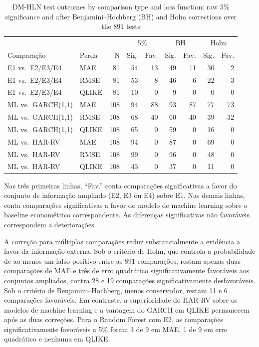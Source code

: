 \documentclass[a4paper,fleqn]{cas-sc}
\begin{document}
\begin{table}[t]
\centering
\caption{DM-HLN test outcomes by comparison type and loss function: raw 5\% significance and after Benjamini--Hochberg (BH) and Holm corrections over the 891 tests}
\label{tab:dm_tests}
\scriptsize
\setlength{\tabcolsep}{2pt}
\begin{tabular}{@{}p{2.2cm}p{0.8cm}rrrrrrr@{}}
\hline
 & & & \multicolumn{2}{c}{5\%} & \multicolumn{2}{c}{BH} & \multicolumn{2}{c}{Holm} \\
Comparação & Perda & N & Sig. & Fav. & Sig. & Fav. & Sig. & Fav. \\
\hline
E1 vs.\ E2/E3/E4 & MAE & 81 & 54 & 13 & 49 & 11 & 30 & 2 \\
E1 vs.\ E2/E3/E4 & RMSE & 81 & 53 & 8 & 46 & 6 & 22 & 3 \\
E1 vs.\ E2/E3/E4 & QLIKE & 81 & 10 & 0 & 9 & 0 & 0 & 0 \\
ML vs.\ GARCH(1,1) & MAE & 108 & 94 & 88 & 93 & 87 & 77 & 73 \\
ML vs.\ GARCH(1,1) & RMSE & 108 & 68 & 40 & 60 & 40 & 39 & 32 \\
ML vs.\ GARCH(1,1) & QLIKE & 108 & 65 & 0 & 59 & 0 & 16 & 0 \\
ML vs.\ HAR-RV & MAE & 108 & 94 & 0 & 87 & 0 & 69 & 0 \\
ML vs.\ HAR-RV & RMSE & 108 & 99 & 0 & 96 & 0 & 48 & 0 \\
ML vs.\ HAR-RV & QLIKE & 108 & 43 & 0 & 37 & 0 & 11 & 0 \\
\hline
\end{tabular}
\end{table}

Nas três primeiras linhas, ``Fav.'' conta comparações significativas a favor do conjunto de informação ampliado (E2, E3 ou E4) sobre E1. Nas demais linhas, conta comparações significativas a favor do modelo de machine learning sobre o baseline econométrico correspondente. As diferenças significativas não favoráveis correspondem a deteriorações.

A correção para múltiplas comparações reduz substancialmente a evidência a favor da informação externa. Sob o critério de Holm, que controla a probabilidade de ao menos um falso positivo entre as 891 comparações, restam apenas duas comparações de MAE e três de erro quadrático significativamente favoráveis aos conjuntos ampliados, contra 28 e 19 comparações significativamente desfavoráveis. Sob o critério de Benjamini--Hochberg, menos conservador, restam 11 e 6 comparações favoráveis. Em contraste, a superioridade do HAR-RV sobre os modelos de machine learning e a vantagem do GARCH em QLIKE permanecem após as duas correções. Para o Random Forest com E2, as comparações significativamente favoráveis a 5\% foram 3 de 9 em MAE, 1 de 9 em erro quadrático e nenhuma em QLIKE.
\end{document}
